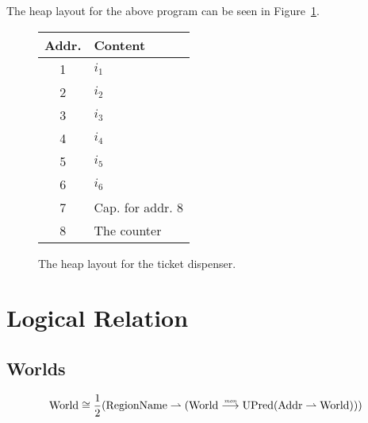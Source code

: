 \documentclass{article}
\newcommand{\parfun}{\rightharpoonup}
\newcommand{\monfun}{\stackrel{\textit{\tiny{mon}}}{\longrightarrow}}
\newcommand{\plaindom}[1]{\mathrm{#1}}
\newcommand{\Addrs}{\plaindom{Addr}}
\newcommand{\RegionName}{\plaindom{RegionName}}
\newcommand{\Worlds}{\plaindom{World}}
\newcommand{\UPred}[1]{\plaindom{UPred}(#1)}
\begin{document}
The heap layout for the above program can be seen in Figure~\ref{tab:tick-disp-heap}.
\begin{figure}[h]
  \centering
  \begin{tabular}{ | c | l | }
    \hline
    Addr. & Content \\ \hline
    1   &  $i_1$ \\ \hline
    2   &  $i_2$ \\ \hline
    3   &  $i_3$ \\ \hline
    4   &  $i_4$ \\ \hline
    5   &  $i_5$ \\ \hline
    6   &  $i_6$ \\ \hline
    7   & Cap. for addr. 8 \\ \hline
    8   & The counter \\ \hline  
  \end{tabular}
  \caption{The heap layout for the ticket dispenser.}
  \label{tab:tick-disp-heap}
\end{figure}

\section{Logical Relation}
\label{sec:logical-relation}
\subsection{Worlds}
\[
\Worlds \cong \frac{1}{2} (\RegionName \parfun (\Worlds \monfun \UPred{\Addrs \parfun \Worlds}))
\]
\end{document}
